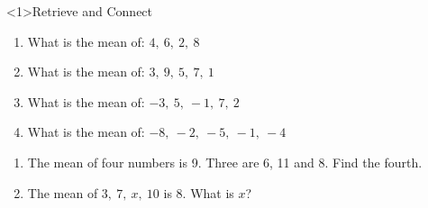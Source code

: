 \documentclass{beamer}
\newcommand{\ashow}[1]{\uncover<2->{\textcolor{red}{\small #1}}}
\newcommand{\ashowq}[1]{\alt<2->{\textcolor{red}{\small #1}}{?}}
\begin{document}
\begin{frame}<1>{Retrieve and Connect}
\vspace{-0.8em}

\footnotesize
\vspace{0.2em}
\begin{enumerate}\itemsep1pt
  \vspace{-1em}
  \item What is the mean of: $4,\ 6,\ 2,\ 8$ \ashow{5}
  \item What is the mean  of: $3,\ 9,\ 5,\ 7,\ 1$ \ashow{5}
  \item What is the mean  of: $-3,\ 5,\ -1,\ 7,\ 2$ \ashow{2}
  \item What is the mean  of: $-8,\ -2,\ -5,\ -1,\ -4$ \ashow{$-4$}
\end{enumerate}

\begin{enumerate}\itemsep1pt
  \setcounter{enumi}8
  \item The mean of four numbers is 9. Three are 6, 11 and 8. Find the fourth. \ashow{11}
  \item The mean of $3,\ 7,\ x,\ 10$ is $8$. What is $x$? \ashow{12}
\end{enumerate}


\end{frame}
\end{document}
